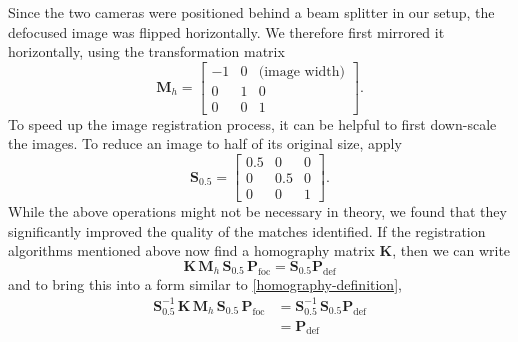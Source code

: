 \documentclass[preprint]{elsarticle}
\begin{document}
Since the two cameras were positioned behind a beam splitter in our setup, the
defocused image was flipped horizontally. We therefore first mirrored it
horizontally, using the transformation matrix
\begin{equation*}
    \mathbf{M}_h = \left[ \begin{array}{ccc}
    -1 & 0 & \text{(image width)} \\
            0 & 1 & 0 \\
            0 & 0 & 1
    \end{array} \right].
\end{equation*}
To speed up the image registration process, it can be helpful to first down-scale the
images. To reduce an image to half of its original size, apply
\begin{equation*}
    \mathbf{S}_{0.5} = \left[ \begin{array}{ccc}
    0.5 & 0 & 0 \\
            0 & 0.5 & 0 \\
            0 & 0 & 1
    \end{array} \right].
\end{equation*}
While the above operations might not be necessary in theory, we found that they
significantly improved the quality of the matches identified.
If the registration algorithms mentioned above now find a homography matrix
$\mathbf{K}$, then we can write
\begin{equation}
    \mathbf{K}\, \mathbf{M}_h\, \mathbf{S}_{0.5}\, \mathbf{P}_\text{foc} =
    \mathbf{S}_{0.5} \mathbf{P}_\text{def}
\end{equation}
and to bring this into a form similar to \eqref{homography-definition}, 
\begin{align}
    \mathbf{S}_{0.5}^{-1}\, \mathbf{K}\, \mathbf{M}_h\, \mathbf{S}_{0.5}\,
    \mathbf{P}_\text{foc} &=
     \mathbf{S}_{0.5}^{-1}\, \mathbf{S}_{0.5} \mathbf{P}_\text{def} \\
     &= \mathbf{P}_\text{def}
\end{align}
\end{document}
